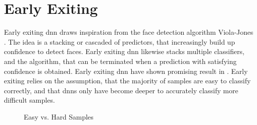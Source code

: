 \hypertarget{earlyexiting}{%
	\chapter{Early Exiting}\label{ch:earlyexit}}
\thispagestyle{fancy}

Early exiting \gls{dnn} draws inspiration from the face detection algorithm Viola-Jones \cite{viola_rapid_2001}. The idea is a stacking or cascaded of predictors, that increasingly build up confidence to detect faces. Early exiting \gls{dnn} likewise stacks multiple classifiers, and the algorithm, that can be terminated when a prediction with satisfying confidence is obtained. Early exiting \gls{dnn} have shown promising result in \cite{leroux_cascading_2017, teerapittayanon_branchynet:_2016, leroux_resource-constrained_2015, teerapittayanon_distributed_2017, huang_multi-scale_2017}. Early exiting relies on the assumption, that the majority of samples are easy to classify correctly, and that \gls{dnn}s only have become deeper to accurately classify more difficult samples.

\begin{figure}
	\captionsetup[subfigure]{justification=centering}
	\centering
	\caption[Easy vs. Hard Samples]{Easy vs. Hard Samples}
	\label{fig:hardvseasydog}
\end{figure}

